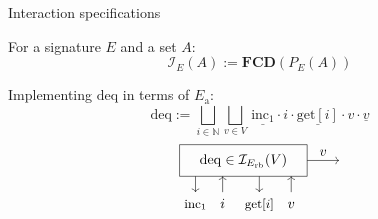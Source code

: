 \documentclass{beamer}
\newcommand{\kw}[1]{\ensuremath{ \mathrm{#1} }}
\newcommand{\deqpic}[3]{%
  \begin{tikzpicture}[scale=0.4]
    \draw (-4,-1) rectangle (4,1);
    \node (x) at (0,0) {$#1$};
    \draw[->] (-3, -1) -- (-3, -2);
    \node[anchor=base] at (-3, -3) {\small $\kw{inc}_1$};
    \draw[<-] (-1.3, -1) -- (-1.3, -2);
    \node[anchor=base] at (-1.3, -3) {$#2$};
    \draw[->] (1, -1) -- (1, -2);
    \node[anchor=base] at (1, -3) {\small $\kw{get}[#2]$};
    \draw[<-] (3, -1) -- (3, -2);
    \node[anchor=base] at (3, -3) {$#3$};
    \draw[->] (4,0) -- node[above] {$#3$} (6,0);
  \end{tikzpicture}%
}
\begin{document}
\begin{frame}{Interaction specifications} %
  \begin{definition}
    For a signature $E$ and a set $A$:
    \[
      \mathcal{I}_E(A) := \mathbf{FCD}(P_E(A))
    \]
  \end{definition}
  \pause
  \begin{example}
    Implementing $\kw{deq}$ in terms of $E_\kw{a}$:
    \[
      \kw{deq} :=
        \bigsqcup_{i \in \mathbb{N}}
        \bigsqcup_{v \in V}
          \, \underline{\kw{inc}_1} \cdot i \cdot
             \underline{\kw{get}[i]} \cdot v \cdot \underline{v}
    \]
    \[
      \deqpic{\kw{deq} \in \mathcal{I}_{E_\kw{rb}}(V)}{i}{v}
    \]
  \end{example}
\end{frame}
\end{document}
